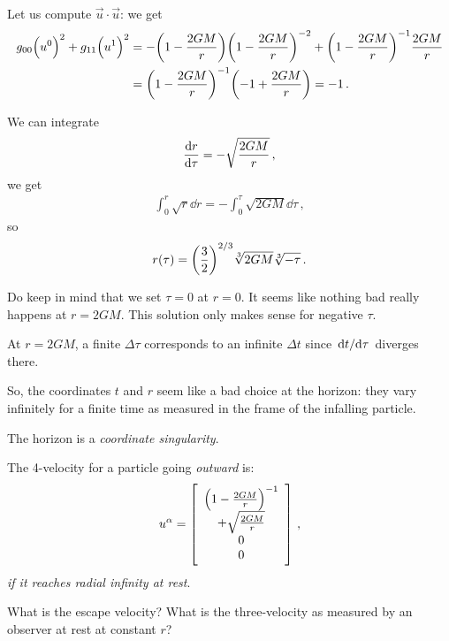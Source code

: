 \documentclass[main.tex]{subfiles}
\begin{document}
Let us compute \(\vec{u} \cdot \vec{u}\): we get 
%
\begin{subequations}
\begin{align}
  g_{00} \qty(u^{0})^2 + g_{11} \qty(u^{1})^2
  &= - \qty(1 - \frac{2GM}{r})\qty(1 - \frac{2GM}{r})^{-2}
  + \qty(1 - \frac{2GM}{r})^{-1} \frac{2GM}{r}  \\
  &= \qty(1 - \frac{2GM}{r})^{-1} \qty(-1 + \frac{2GM}{r})= -1 
\,.
\end{align}
\end{subequations}
%

We can integrate 
%
\begin{align}
  \dv{r}{\tau } = - \sqrt{\frac{2GM}{r}}
\,,
\end{align}
%
we get 
%
\begin{align}
  \int _{0}^{r} \sqrt{r} \dd{r} =- \int _{0}^{\tau } \sqrt{2GM} \dd{\tau }   
\,,
\end{align}
%
so 
%
\begin{align}
  r(\tau ) = \qty(\frac{3}{2})^{2/3} \sqrt[3]{2GM} \sqrt[3]{- \tau } 
\,.
\end{align}

Do keep in mind that we set \(\tau =0\) at \(r=0\). 
It seems like nothing bad really happens at \(r=2GM\). 
This solution only makes sense for negative \(\tau \). 

At \(r = 2GM\), a finite \(\Delta \tau \) corresponds to an infinite \(\Delta t\) since \(\dv*{t}{\tau }\) diverges  there. 

So, the coordinates \(t\) and \(r\) seem like a bad choice at the horizon: they vary infinitely for a finite time as measured in the frame of the infalling particle. 

The horizon is a \emph{coordinate singularity}. 

The 4-velocity for a particle going \emph{outward} is: 
%
\begin{subequations}
\begin{align}
  u^{\alpha } = \left[\begin{array}{c}
    \qty(1 - \frac{2GM}{r})^{-1} \\ 
  + \sqrt{\frac{2GM}{r}} \\ 
  0 \\ 
  0
  \end{array}\right]
\,,
\end{align}
\end{subequations}
%
\emph{if it reaches radial infinity at rest}. 

What is the escape velocity? What is  the three-velocity as measured by an observer at rest at constant \(r\)?
\end{document}
